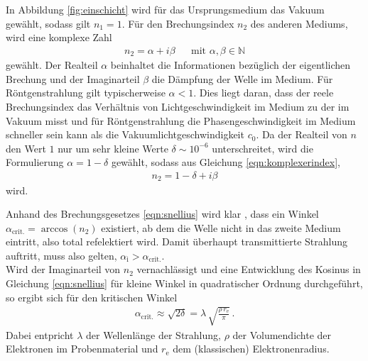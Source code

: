 In Abbildung \ref{fig:einschicht} wird für das Ursprungsmedium das Vakuum gewählt,
sodass gilt $n_{1} = 1$. Für den Brechungsindex $n_{2}$ des anderen Mediums,
wird eine komplexe Zahl
\begin{align}
  n_{2} = \alpha + i \beta& &\text{mit } \alpha, \beta \in \mathbb{N}
  \label{eqn:komplexerindex}
\end{align}
gewählt. Der Realteil $\alpha$ beinhaltet die Informationen bezüglich der
eigentlichen Brechung und der Imaginarteil $\beta$
die Dämpfung der Welle im Medium. Für Röntgenstrahlung gilt typischerweise
$\alpha < 1$. Dies liegt daran, dass der reele Brechungsindex das Verhältnis
von Lichtgeschwindigkeit im Medium zu der im Vakuum misst und für
Röntgenstrahlung die Phasengeschwindigkeit im Medium schneller
sein kann als die Vakuumlichtgeschwindigkeit $c_{0}$.
Da der Realteil von $n$ den Wert $1$ nur um sehr kleine Werte
$\delta \sim 10^{-6}$ unterschreitet, wird die Formulierung
$\alpha = 1 - \delta$ gewählt,
sodass aus Gleichung \eqref{eqn:komplexerindex},
\begin{align}
  n_{2} = 1 - \delta + i \beta
  \label{eqn:komplexerindexdelta}
\end{align}
wird.

Anhand des Brechungsgesetzes \eqref{eqn:snellius} wird klar , dass ein Winkel
$\alpha_\text{{crit.}} = \arccos\left( n_{2} \right)$ existiert,
ab dem die Welle nicht in das zweite Medium eintritt,
also total refelektiert wird.
Damit überhaupt transmittierte Strahlung auftritt, muss also gelten,
$\alpha_{\text{i}} > \alpha_{\text{crit.}}$.\\
Wird der Imaginarteil von $n_{2}$ vernachlässigt und eine Entwicklung
des Kosinus in Gleichung \eqref{eqn:snellius} für kleine Winkel in
quadratischer Ordnung durchgeführt, so ergibt sich für den kritischen Winkel
\begin{align}
  \alpha_{\text{crit.}} \approx \sqrt{2 \delta} = \lambda \,
  \sqrt{\frac{ \rho \, r_{\text{e}} }{ \pi }} \, .
  \label{eqn:elektronendichte}
\end{align}
Dabei entpricht $\lambda$ der Wellenlänge der Strahlung, $\rho$ der
Volumendichte der Elektronen im Probenmaterial und $r_{\text{e}}$ dem
(klassischen) Elektronenradius.

